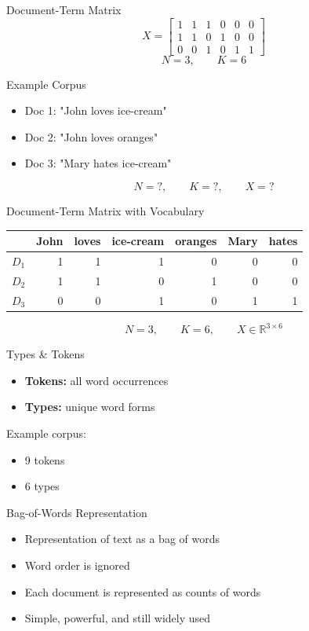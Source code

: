 \documentclass[11pt,aspectratio=43]{beamer}
\begin{document}
\begin{frame}{Document-Term Matrix}
\[
X=\begin{bmatrix}
1&1&1&0&0&0\\
1&1&0&1&0&0\\
0&0&1&0&1&1
\end{bmatrix}
\]
\[
N=3,\qquad K=6
\]
\end{frame}

\begin{frame}{Example Corpus}
\begin{itemize}
\item Doc 1: "John loves ice-cream"
\item Doc 2: "John loves oranges"
\item Doc 3: "Mary hates ice-cream"
\end{itemize}
\[
N=?,\qquad K=?,\qquad X=?
\]
\end{frame}

\begin{frame}{Document-Term Matrix with Vocabulary}
\centering
\scriptsize
\begin{tabular}{c|rrrrrr}
 & John & loves & ice-cream & oranges & Mary & hates\\ \hline
$D_1$&1&1&1&0&0&0\\
$D_2$&1&1&0&1&0&0\\
$D_3$&0&0&1&0&1&1
\end{tabular}
\vspace{1.5em}
\[
N=3,\qquad K=6,\qquad X\in\mathbb{R}^{3\times6}
\]
\end{frame}

\begin{frame}{Types \& Tokens}
\begin{itemize}
\item \textbf{Tokens:} all word occurrences
\item \textbf{Types:} unique word forms
\end{itemize}
\vspace{1em}
Example corpus:
\begin{itemize}
\item 9 tokens
\item 6 types
\end{itemize}
\end{frame}

\begin{frame}{Bag-of-Words Representation}
\begin{itemize}
\item Representation of text as a bag of words
\item Word order is ignored
\item Each document is represented as counts of words
\item Simple, powerful, and still widely used
\end{itemize}
\end{frame}
\end{document}
